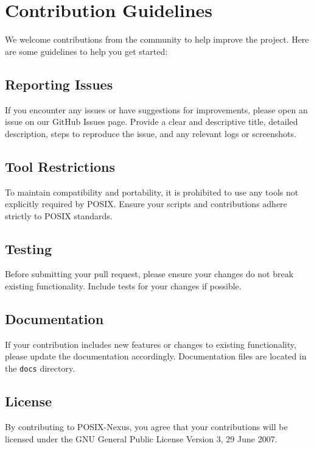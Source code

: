 \section{Contribution Guidelines}
We welcome contributions from the community to help improve the project. Here are some guidelines to help you get started:

\subsection{Reporting Issues}
If you encounter any issues or have suggestions for improvements, please open an issue on our GitHub Issues page. Provide a clear and descriptive title, detailed description, steps to reproduce the issue, and any relevant logs or screenshots.

\subsection{Tool Restrictions}
To maintain compatibility and portability, it is prohibited to use any tools not explicitly required by POSIX. Ensure your scripts and contributions adhere strictly to POSIX standards.

\subsection{Testing}
Before submitting your pull request, please ensure your changes do not break existing functionality. Include tests for your changes if possible.

\subsection{Documentation}
If your contribution includes new features or changes to existing functionality, please update the documentation accordingly. Documentation files are located in the \texttt{docs} directory.

\subsection{License}
By contributing to POSIX-Nexus, you agree that your contributions will be licensed under the GNU General Public License Version 3, 29 June 2007.
\newpage